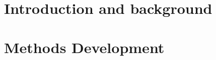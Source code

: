 





\renewcommand*{\chapterpagestyle}{empty}


\renewcommand*{\chapterpagestyle}{plain}
\cleardoublepage
\pagestyle{plain}

\renewcommand{\BrainFuckChapter}{
}

{}

\tableofcontents

\renewcommand{\BrainFuckChapter}{
}
\listoffigures

\renewcommand{\BrainFuckChapter}{
}





\cleardoublepage

\acresetall{}
\renewcommand*{\chapterpagestyle}{scrheadings}

\pagestyle{scrheadings}
% 

\part{Introduction and background}
\label{part:intro_background}




\part{Methods Development}
\label{part:methods-development}




